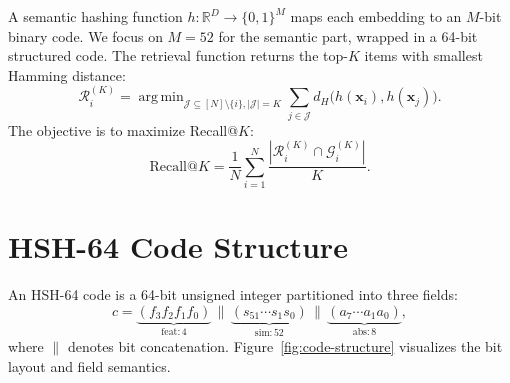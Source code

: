 \documentclass[11pt,a4paper]{article}
\DeclareMathOperator*{\argmin}{arg\,min}
\begin{document}
A semantic hashing function $h: \mathbb{R}^D \to \{0,1\}^M$ maps each embedding to an $M$-bit binary code. We focus on $M=52$ for the semantic part, wrapped in a 64-bit structured code. The retrieval function returns the top-$K$ items with smallest Hamming distance:
\begin{equation}
    \mathcal{R}_i^{(K)} = \argmin_{\mathcal{J} \subseteq [N] \setminus \{i\}, |\mathcal{J}|=K} \sum_{j \in \mathcal{J}} d_H\bigl(h(\mathbf{x}_i), h(\mathbf{x}_j)\bigr).
\end{equation}
The objective is to maximize Recall@$K$:
\begin{equation}
    \text{Recall@}K = \frac{1}{N} \sum_{i=1}^{N} \frac{| \mathcal{R}_i^{(K)} \cap \mathcal{G}_i^{(K)} |}{K}.
\end{equation}

\section{HSH-64 Code Structure}

An HSH-64 code is a 64-bit unsigned integer partitioned into three fields:
\begin{equation}
    c = \underbrace{(f_3 f_2 f_1 f_0)}_{\text{feat}: 4}
    \,\|\,
    \underbrace{(s_{51} \cdots s_1 s_0)}_{\text{sim}: 52}
    \,\|\,
    \underbrace{(a_7 \cdots a_1 a_0)}_{\text{abs}: 8},
\end{equation}
where $\|$ denotes bit concatenation. Figure~\ref{fig:code-structure} visualizes the bit layout and field semantics.
\end{document}
